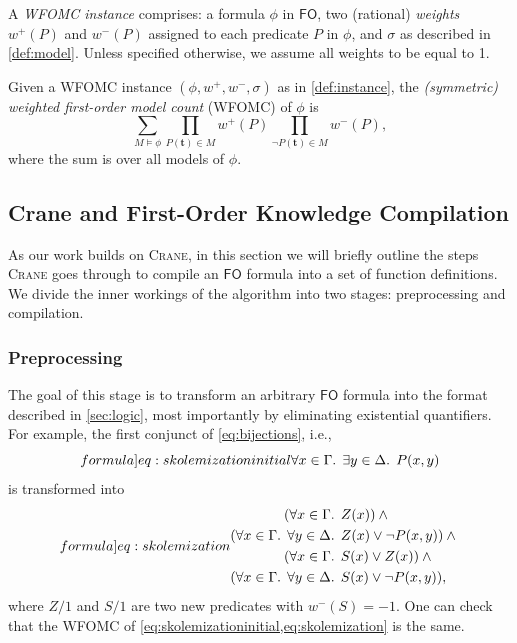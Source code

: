 \documentclass[a4paper,UKenglish,cleveref, autoref, thm-restate]{lipics-v2021}
\newcommand{\FO}{$\mathsf{FO}$}
\begin{document}
\begin{definition}\label{def:instance}
  A \emph{WFOMC instance} comprises: a formula $\phi$ in \FO{}, two (rational)
  \emph{weights} $w^{+}(P)$ and $w^{-}(P)$ assigned to each predicate $P$ in
  $\phi$, and $\sigma$ as described in \cref{def:model}. Unless specified
  otherwise, we assume all weights to be equal to 1.
\end{definition}

\begin{definition}
  Given a WFOMC instance $(\phi, w^{+}, w^{-}, \sigma)$ as in
  \cref{def:instance}, the \emph{(symmetric) weighted first-order model count}
  (WFOMC) of $\phi$ is
  \begin{equation}\label{eq:wfomc}
    \sum_{M \models \phi} \prod_{P(\mathbf{t}) \in M} w^{+}(P) \prod_{\neg P(\mathbf{t}) \in M} w^{-}(P),
  \end{equation}
  where the sum is over all models of $\phi$.
\end{definition}

\subsection{Crane and First-Order Knowledge Compilation}\label{sec:crane}

As our work builds on \textsc{Crane}, in this section we will briefly outline
the steps \textsc{Crane} goes through to compile an \FO{} formula into a set of
function definitions. We divide the inner workings of the algorithm into two
stages: preprocessing and compilation.

\subsubsection{Preprocessing}

The goal of this stage is to transform an arbitrary \FO{} formula into the
format described in \cref{sec:logic}, most importantly by eliminating
existential quantifiers. For example, the first conjunct of
\cref{eq:bijections}, i.e.,
\begin{equation}\label[formula]{eq:skolemizationinitial}
  \forall x \in \Gamma\text{. }\exists y \in \Delta\text{. } P(x, y)
\end{equation}
is transformed into
\begin{equation}\label[formula]{eq:skolemization}
  \begin{aligned}
    (\forall x \in \Gamma\text{. } &Z(x))\land{}\\
    (\forall x \in \Gamma\text{. } \forall y \in \Delta\text{. } &Z(x) \lor \neg P(x, y))\land{}\\
    (\forall x \in \Gamma\text{. } &S(x) \lor Z(x))\land{}\\
    (\forall x \in \Gamma\text{. } \forall y \in \Delta\text{. } &S(x) \lor \neg P(x, y)),
  \end{aligned}
\end{equation}
where $Z/1$ and $S/1$ are two new predicates with $w^{-}(S) = -1$. One can check
that the WFOMC of \cref{eq:skolemizationinitial,eq:skolemization} is the same.
\end{document}

